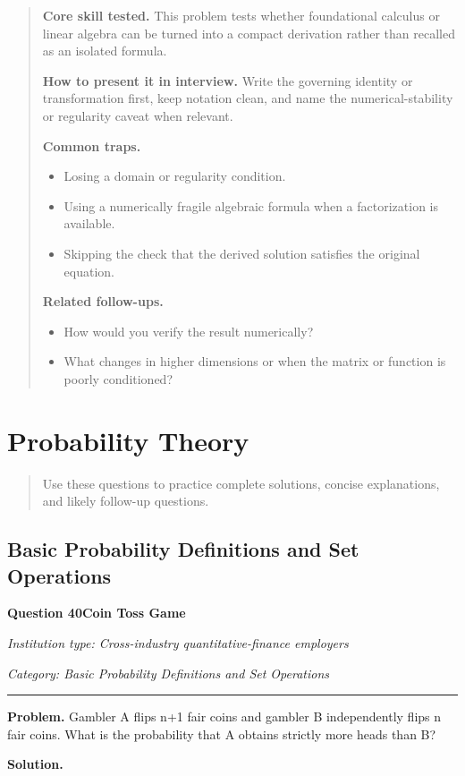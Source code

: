 \documentclass[11pt,letterpaper,openany]{book}
\newcommand{\ChapterIntro}[1]{%
  \begin{quote}\small #1\end{quote}%
}
\newenvironment{EditorialNote}
  {\begin{quote}\small\setlength{\parskip}{0.25em}}
  {\end{quote}}
\newcommand{\QuestionSpacer}{\vspace{0.4em}}
\newcommand{\FoundationQuestionHeader}[3]{%
  \vspace{1.0em}%
  {\large\bfseries #1\enspace #2\par}%
  {\small\itshape Institution type: Cross-industry quantitative-finance employers\par}%
  {\small\itshape Category: #3\par}%
  \vspace{0.25em}\hrule\vspace{0.45em}%
}
\begin{document}
\begin{EditorialNote}


\textbf{Core skill tested.} This problem tests whether foundational calculus or linear algebra can be turned into a compact derivation rather than recalled as an isolated formula.


\textbf{How to present it in interview.} Write the governing identity or transformation first, keep notation clean, and name the numerical-stability or regularity caveat when relevant.


\textbf{Common traps.}
\begin{itemize}
\item Losing a domain or regularity condition.
\item Using a numerically fragile algebraic formula when a factorization is available.
\item Skipping the check that the derived solution satisfies the original equation.
\end{itemize}


\textbf{Related follow-ups.}
\begin{itemize}
\item How would you verify the result numerically?
\item What changes in higher dimensions or when the matrix or function is poorly conditioned?
\end{itemize}


\end{EditorialNote}
\QuestionSpacer

\section{Probability Theory}

\ChapterIntro{Use these questions to practice complete solutions, concise explanations, and likely follow-up questions.}

\subsection{Basic Probability Definitions and Set Operations}

\FoundationQuestionHeader{Question 40}{Coin Toss Game}{Basic Probability Definitions and Set Operations}

\textbf{Problem.} Gambler A flips n+1 fair coins and gambler B independently flips n fair coins. What is the probability that A obtains strictly more heads than B?


\textbf{Solution.}
\end{document}
